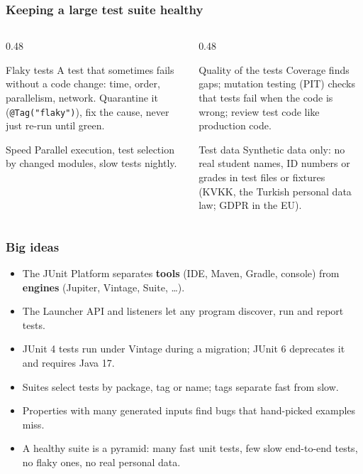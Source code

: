 \documentclass[aspectratio=169,10pt,compress]{beamer}
\begin{document}
\begin{frame}[t,fragile] \frametitle{Keeping a large test suite healthy}
  \begin{columns}[T]
    \begin{column}{0.48\textwidth}
      \begin{block}{Flaky tests}
        \small A test that sometimes fails without a code change: time, order, parallelism, network.
        Quarantine it (\texttt{@Tag("flaky")}), fix the cause, never just re-run until green.
      \end{block}
      \begin{block}{Speed}
        \small Parallel execution, test selection by changed modules, slow tests nightly.
      \end{block}
    \end{column}
    \begin{column}{0.48\textwidth}
      \begin{block}{Quality of the tests}
        \small Coverage finds gaps; mutation testing (PIT) checks that tests fail when the code is wrong;
        review test code like production code.
      \end{block}
      \begin{block}{Test data}
        \small Synthetic data only: no real student names, ID numbers or grades in test files or fixtures
        (KVKK, the Turkish personal data law; GDPR in the EU).
      \end{block}
    \end{column}
  \end{columns}
\end{frame}





\begin{frame}[t,fragile] \frametitle{Big ideas}
  \begin{itemize}
    \item The JUnit Platform separates \textbf{tools} (IDE, Maven, Gradle, console) from \textbf{engines} (Jupiter, Vintage, Suite, \dots).
    \item The Launcher API and listeners let any program discover, run and report tests.
    \item JUnit 4 tests run under Vintage during a migration; JUnit 6 deprecates it and requires Java 17.
    \item Suites select tests by package, tag or name; tags separate fast from slow.
    \item Properties with many generated inputs find bugs that hand-picked examples miss.
    \item A healthy suite is a pyramid: many fast unit tests, few slow end-to-end tests, no flaky ones, no real personal data.
  \end{itemize}
\end{frame}
\end{document}
